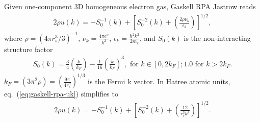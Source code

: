 Given one-component 3D homogeneous electron gas, Gaskell RPA Jastrow reads~\cite{Holzmann2009}
\begin{align}
2\rho u(k) = -S_0^{-1}(k) + \left[ S_0^{-2}(k) + \left( \frac{2\rho \nu_k}{\epsilon_k} \right) \right] ^{1/2}, \label{eq:gaskell-rpa-uk}
\end{align}
where $\rho = (4\pi r_s^3/3)^{-1}$, $\nu_k = \frac{4\pi e^2}{k^2}$, $\epsilon_k=\frac{\hbar^2 k^2}{2m_e}$, and $S_0(k)$ is the non-interacting structure factor
\begin{align}
S_0(k) = \frac{3}{4} \left(\frac{k}{k_F}\right) - \frac{1}{16}\left(\frac{k}{k_F}\right)^3,\text{ for } k\in[0,2k_F]; 1.0 \text{ for } k > 2k_F.
\end{align}
$k_F=(3\pi^2\rho)=\left(\frac{9\pi}{4r_s^3}\right)^{1/3}$ is the Fermi k vector. In Hatree atomic units, eq.~(\ref{eq:gaskell-rpa-uk}) simplifies to
\begin{align}
2\rho u(k) = -S_0^{-1}(k) + \left[ S_0^{-2}(k) + \left( \frac{12}{r_s^3 k^4} \right) \right]^{1/2}. \label{eq:gaskell-uk-au}
\end{align}